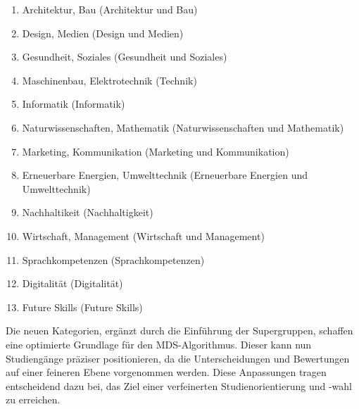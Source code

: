 \begin{enumerate}
    \item Architektur, Bau (Architektur und Bau)
    \item Design, Medien (Design und Medien)
    \item Gesundheit, Soziales (Gesundheit und Soziales)
    \item Maschinenbau, Elektrotechnik (Technik)
    \item Informatik (Informatik)
    \item Naturwissenschaften, Mathematik (Naturwissenschaften und Mathematik)
    \item Marketing, Kommunikation (Marketing und Kommunikation)
    \item Erneuerbare Energien, Umwelttechnik (Erneuerbare Energien und
    Umwelttechnik)
    \item Nachhaltikeit (Nachhaltigkeit)
    \item Wirtschaft, Management (Wirtschaft und Management)
    \item Sprachkompetenzen (Sprachkompetenzen)
    \item Digitalität (Digitalität)
    \item Future Skills (Future Skills)
\end{enumerate}

Die neuen Kategorien, ergänzt durch die Einführung der Supergruppen, schaffen
eine optimierte Grundlage für den MDS-Algorithmus. Dieser kann nun Studiengänge
präziser positionieren, da die Unterscheidungen und Bewertungen auf einer
feineren Ebene vorgenommen werden. Diese Anpassungen tragen entscheidend dazu
bei, das Ziel einer verfeinerten Studienorientierung und -wahl zu erreichen.
